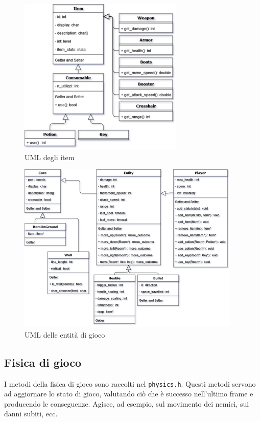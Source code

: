 \documentclass{article}
\begin{document}
\begin{figure}[!ht]
    \centering
    \includegraphics[width=0.7\textwidth]{UML_Prog_Programmazione_item.png}
    \caption{UML degli item}
    \label{fig:1}
\end{figure}
\FloatBarrier
\begin{figure}[!ht]
    \centering
    \includegraphics[width=0.95\textwidth]{UML_Prog_Programmazione.png}
    \caption{UML delle entità di gioco}
    \label{fig:2}
\end{figure}
\FloatBarrier


\subsection{Fisica di gioco}
I metodi della fisica di gioco sono raccolti nel \texttt{physics.h}. Questi metodi servono ad aggiornare lo stato di gioco, valutando ciò che è successo nell'ultimo frame e producendo le conseguenze. Agisce, ad esempio, sul movimento dei nemici, sui danni subiti, ecc.
\end{document}
